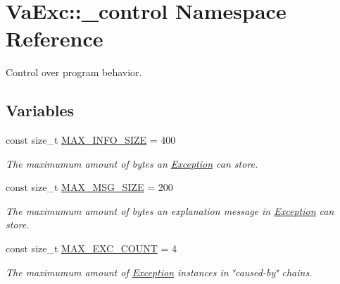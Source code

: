\hypertarget{namespace_va_exc_1_1__control}{}\section{Va\+Exc\+:\+:\+\_\+control Namespace Reference}
\label{namespace_va_exc_1_1__control}


Control over program behavior.  


\subsection*{Variables}
\begin{DoxyCompactItemize}
\item 
\mbox{\label{namespace_va_exc_1_1__control_a6912a4c673354b7888697acc7b998a00}} 
const size\+\_\+t \hyperlink{namespace_va_exc_1_1__control_a6912a4c673354b7888697acc7b998a00}{M\+A\+X\+\_\+\+I\+N\+F\+O\+\_\+\+S\+I\+ZE} = 400
\begin{DoxyCompactList}\small\item\em The maximumum amount of bytes an \hyperlink{class_va_exc_1_1_exception}{Exception} can store. \end{DoxyCompactList}\item 
\mbox{\label{namespace_va_exc_1_1__control_aad5ec6136f6195d13e0b307b0155f10e}} 
const size\+\_\+t \hyperlink{namespace_va_exc_1_1__control_aad5ec6136f6195d13e0b307b0155f10e}{M\+A\+X\+\_\+\+M\+S\+G\+\_\+\+S\+I\+ZE} = 200
\begin{DoxyCompactList}\small\item\em The maximumum amount of bytes an explanation message in \hyperlink{class_va_exc_1_1_exception}{Exception} can store. \end{DoxyCompactList}\item 
\mbox{\label{namespace_va_exc_1_1__control_a81db0c6564756e1bbdfa00cb129464d6}} 
const size\+\_\+t \hyperlink{namespace_va_exc_1_1__control_a81db0c6564756e1bbdfa00cb129464d6}{M\+A\+X\+\_\+\+E\+X\+C\+\_\+\+C\+O\+U\+NT} = 4
\begin{DoxyCompactList}\small\item\em The maximumum amount of \hyperlink{class_va_exc_1_1_exception}{Exception} instances in \char`\"{}caused-\/by\char`\"{} chains. \end{DoxyCompactList}\item 

\end{DoxyCompactItemize}
